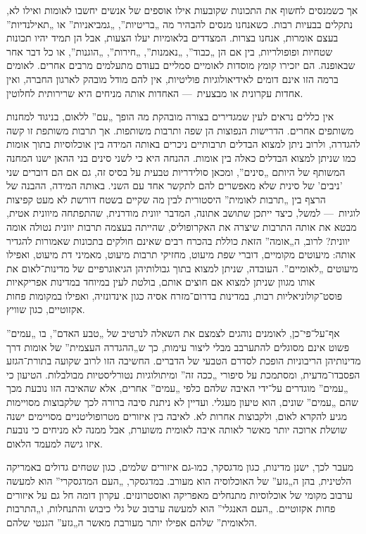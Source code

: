 אך כשמנסים לחשוף את התכונות שקובעות אילו אוספים של אנשים יחשבו לאומות ואילו לא, נתקלים בבעיות רבות. כשאנחנו מנסים להבהיר מה „בריטיות”, „גמביאניות” או „תאילנדיות” בעצם אומרות, אנחנו בצרות. המצדדים בלאומיות יעלו הצעות, אבל הן תמיד יהיו תכונות שטחיות ופופולריות, בין אם הן „כבוד”, „נאמנות”, „חירות”, „הוגנות”, או כל דבר אחר שבאופנה. הם יזכירו קומץ מוסדות לאומיים סמליים בעודם מתעלמים מרבים אחרים. לאומים ברמה הזו אינם דומים לאידיאולוגיות פוליטיות, אין להם מודל מובהק לארגון החברה, ואין אחדות עקרונית או מבצעית~— האחדות אותה מניחים היא שרירותית לחלוטין.

אין כללים נראים לעין  שמגדירים בצורה מובהקת מה הופך „עם” ללאום, בניגוד למחנות משותפים אחרים. הדרישות הנפוצות הן שפה ותרבות משותפות. אך תרבות משותפת זו קשה להגדרה, ולרוב ניתן למצוא הבדלים תרבותיים ניכרים באותה המידה בין אוכלוסיות בתוך אומות כמו שניתן למצוא הבדלים כאלה בין אומות. ההנחה היא כי לשני סינים בני ההאן ישנו המחנה המשותף של היותם „סינים”, ומכאן סולידריות טבעית על בסיס זה, גם אם הם דוברים שני 'ניבים' של סינית שלא מאפשרים להם לתקשר אחד עם השני. באותה המידה, ההבנה של הרצף בין „תרבות לאומית” היסטורית לבין מה  שקיים בשטח דורשת לא מעט קפיצות לוגיות~— למשל, כיצד ייתכן שתושב אתונה, המדבר יוונית מודרנית, שהתפתחה מיוונית אטית, מבטא את אותה התרבות שיצרה את האקרופוליס, שהייתה בעצמה תרבות יוונית נטולה אומה יוונית? לרוב, ה„אומה” הזאת כוללת בהכרח רבים שאינם חולקים בתכונות שאמורות להגדיר אותה: מיעוטים מקומיים, דוברי שפת מיעוט, מחזיקי תרבות מיעוט, מאמיני דת מיעוט, ואפילו מיעוטים „לאומיים”. העובדה, שניתן למצוא בתוך גבולותיהן הגיאוגרפיים של מדינות־לאום את אותו מגוון שניתן למצוא אם חוצים אותם, בולטת לעין במיוחד במדינות אפריקאיות פוסט־קולוניאליות רבות, במדינות בדרום־מזרח אסיה כגון אינדונזיה, ואפילו במקומות פחות אקזוטיים, כגון שוויץ.

אף־על־פי־כן, לאומנים נוהגים לצמצם את השאלה לנרטיב של „טבע האדם”, בו „עמים” פשוט אינם מסוגלים להתערבב מבלי ליצור עימות, כך ש„ההגדרה העצמית” של אומות דרך מדינותיהן הריבוניות הופכת לסדרם הטבעי של הדברים. החשיבה הזו לרוב שקועה בתורת־הגזע הפסבדו־מדעית, ומסתמכת על סיפורי „ככה זה” ומיתולוגיות נטורליסטיות מבולבלות. הטיעון כי „עמים” מוגדרים על־ידי האיבה שלהם כלפי „עמים” אחרים, אלא שהאיבה הזו נובעת מכך שהם „עמים” שונים, הוא טיעון מעגלי. ועדיין לא ניתנת סיבה ברורה לכך שלקבוצות מסויימות מגיע להקרא לאום, ולקבוצות אחרות לא. לאיבה בין איזורים מטרופוליטניים מסויימים ישנה שושלת ארוכה יותר מאשר לאותה איבה לאומית משוערת, אבל ממנה לא מניחים כי נובעת איזו גישה למעמד הלאום.

מעבר לכך, ישנן מדינות, כגון מדגסקר, כמו-גם איזורים שלמים, כגון שטחים גדולים באמריקה הלטינית, בהן ה„גזע” של האוכלוסיה הוא מעורב. במדגסקר, „העם המדגסקרי” הוא למעשה ערבוב מקומי של אוכלוסיות מתנחלים מאפריקה ואוסטרונזים. עקרון דומה חל גם על איזורים פחות אקזוטיים. „העם האנגלי” הוא למעשה ערבוב של גלי כיבוש והתנחלות, ו„התרבות הלאומית” שלהם אפילו יותר מעורבת מאשר ה„גזע” הגנטי שלהם.

